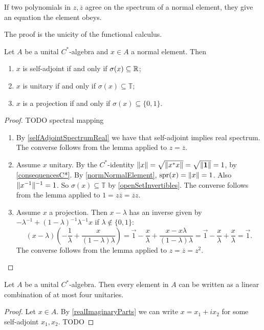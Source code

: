 \begin{lemma}
If two polynomials in $z,\overline{z}$ agree on the spectrum of a normal element, they give an equation the element obeys.
\end{lemma}
The proof is the unicity of the functional calculus.
\begin{corollary} \label{propertiesFromSpectrum}
Let $A$ be a unital $C^*$-algebra and $x\in A$ a normal element. Then
\begin{enumerate}
\item $x$ is self-adjoint \textup{if and only if} $\sigma(x)\subseteq \mathbb{R}$;
\item $x$ is unitary \textup{if and only if} $\sigma(x)\subseteq \mathbb{T}$;
\item $x$ is a projection \textup{if and only if} $\sigma(x)\subseteq \{0,1\}$.
\end{enumerate}
\end{corollary}
\begin{proof}
\hspace{1em} TODO spectral mapping
\begin{enumerate}
\item By \ref{selfAdjointSpectrumReal} we have that self-adjoint implies real spectrum. The converse follows from the lemma applied to $z = \overline{z}$.
\item Assume $x$ unitary. By the $C^*$-identity $\lVert x\rVert = \sqrt{\lVert x^*x\rVert} = 
\sqrt{\lVert\boldsymbol{\mathrm{1}}\rVert} = 1$, by \ref{consequencesC*}. By \ref{normNormalElement}, $\operatorname{spr}(x) = \lVert x\rVert = 1$. Also $\lVert x^{-1}\rVert^{-1} = 1$. So $\sigma(x)\subseteq \mathbb{T}$ by \ref{openSetInvertibles}. The converse follows from the lemma applied to $1 = z\overline{z} = \overline{z}z$.
\item Assume $x$ a projection. Then $x-\lambda$ has an inverse given by $-\lambda^{-1} + (1 - \lambda)^{-1}\lambda^{-1}x$ if $\lambda \notin \{0,1\}$:
\[ (x-\lambda)\left( - \frac{1}{\lambda} + \frac{x}{(1-\lambda)\lambda} \right) = \vec{1} - \frac{x}{\lambda} + \frac{x-x\lambda}{(1-\lambda)\lambda} =  \vec{1} - \frac{x}{\lambda} + \frac{x}{\lambda} = \vec{1}. \]
The converse follows from the lemma applied to $z = \overline{z} = z^2$.
\end{enumerate}
\end{proof}



\begin{proposition}
Let $A$ be a unital $C^*$-algebra. Then every element in $A$ can be written as a linear combination of at most four unitaries.
\end{proposition}
\begin{proof}
Let $x\in A$. By \ref{realImaginaryParts} we can write $x=x_1+ix_2$ for some self-adjoint $x_1,x_2$.
TODO
\end{proof}

